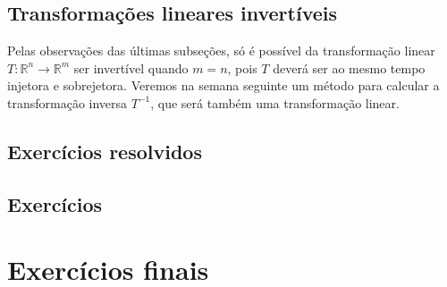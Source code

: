 \subsection{Transformações lineares invertíveis}

Pelas observações das últimas subseções, só é possível da transformação linear $T: \mathbb{R}^n \to \mathbb{R}^m$ ser invertível quando $m=n$, pois $T$ deverá ser ao mesmo tempo injetora e sobrejetora. Veremos na semana seguinte um método para calcular a transformação inversa $T^{-1}$, que será também uma transformação linear.

\subsection*{Exercícios resolvidos}

\construirExeresol

\subsection*{Exercícios}

\construirExer

\section{Exercícios finais}

\construirExer

% 